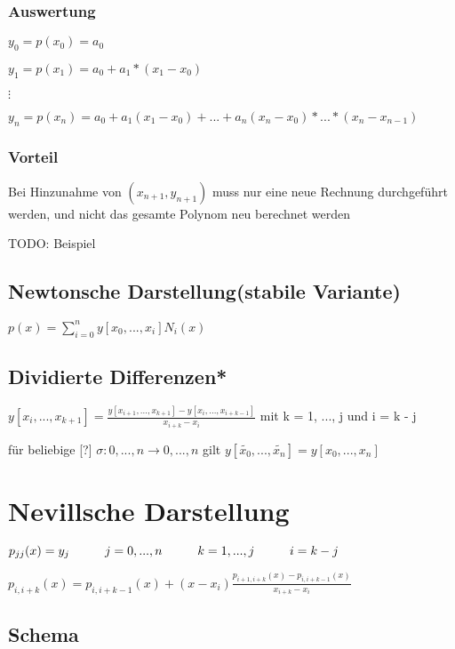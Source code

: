 \documentclass[12pt,a4paper]{article} %
\newcommand*\tab[1][1cm]{\hspace*{#1}}
\begin{document}
	\subsubsection{Auswertung}
	
	$y_0 = p(x_0) = a_0$
	
	$y_1 = p(x_1) = a_0 + a_1 * (x_1 - x_0)$
	
	$\vdots$
	
	$y_n = p(x_n) = a_0 + a_1(x_1 - x_0) + ... + a_n(x_n - x_0) * ... * (x_n - x_{n - 1})$
	
	\subsubsection{Vorteil}
	
	Bei Hinzunahme von $(x_{n + 1}, y_{n + 1})$ muss nur eine neue Rechnung durchgeführt werden, und nicht das gesamte Polynom neu berechnet werden
	
	TODO: Beispiel
	
	\subsection[Newtonsche Darstellung]{Newtonsche Darstellung(stabile Variante)}
	
	$p(x) = \sum\limits_{i = 0}^{n}y[x_0, ..., x_i] N_i(x)$
	
	\subsection{Dividierte Differenzen*}
	
	$y[x_i, ..., x_{k + 1}] = \frac{y[x_{i + 1}, ..., x_{k + 1}] - y[x_i, ..., x_{i + k - 1}]}{x_{i + k} - x_i}$ mit k = 1, ..., j und i = k - j
	
	für beliebige [?] $\sigma:{0, ..., n} \rightarrow {0, ..., n}$ gilt $y[\tilde{x_0}, ..., \tilde{x_n}] = y[x_0, ..., x_n]$
	
	\newpage
	
	\section{Nevillsche Darstellung}
	
	$p_{jj}(x) = y_j \tab j = 0, ..., n \tab k = 1, ..., j \tab i = k - j$
	
	$p_{i, i + k}(x) = p_{i, i + k - 1}(x) + (x - x_i)\frac{p_{i + 1, i + k}(x) - p_{i, i + k - 1}(x)}{x_{i + k} - x_i}$
	
	\subsection{Schema}
	
\end{document}
